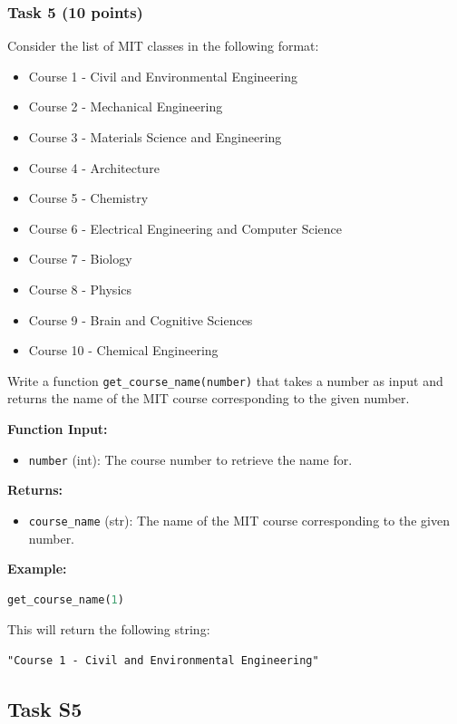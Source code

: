 \documentclass[12pt]{article}
\begin{document}
\subsubsection{Task 5 (10 points)}
Consider the list of MIT classes in the following format:

\begin{itemize}
\item Course 1 - Civil and Environmental Engineering
\item Course 2 - Mechanical Engineering
\item Course 3 - Materials Science and Engineering
\item Course 4 - Architecture
\item Course 5 - Chemistry
\item Course 6 - Electrical Engineering and Computer Science
\item Course 7 - Biology
\item Course 8 - Physics
\item Course 9 - Brain and Cognitive Sciences
\item Course 10 - Chemical Engineering
\end{itemize}

Write a function \texttt{get\_course\_name(number)} that takes a number as input and returns the name of the MIT course corresponding to the given number.

\textbf{Function Input:}
\begin{itemize}
\item \texttt{number} (int): The course number to retrieve the name for.
\end{itemize}

\textbf{Returns:}
\begin{itemize}
\item \texttt{course\_name} (str): The name of the MIT course corresponding to the given number.
\end{itemize}

\textbf{Example:}
\begin{lstlisting}[language=Python]
get_course_name(1)
\end{lstlisting}
This will return the following string:
\begin{verbatim}
"Course 1 - Civil and Environmental Engineering"
\end{verbatim}
\newpage
\subsection{Task S5}
\end{document}
